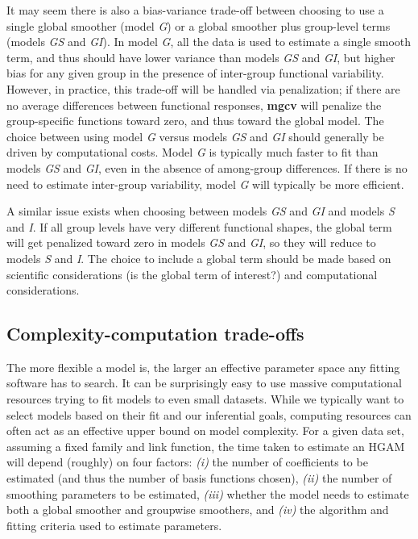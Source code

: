 \documentclass[12pt]{article}
\begin{document}
It may seem there is also a bias-variance trade-off between choosing to
use a single global smoother (model \emph{G}) or a global smoother plus
group-level terms (models \emph{GS} and \emph{GI}). In model \emph{G},
all the data is used to estimate a single smooth term, and thus should
have lower variance than models \emph{GS} and \emph{GI}, but higher bias
for any given group in the presence of inter-group functional
variability. However, in practice, this trade-off will be handled via
penalization; if there are no average differences between functional
responses, \textbf{mgcv} will penalize the group-specific functions
toward zero, and thus toward the global model. The choice between using
model \emph{G} versus models \emph{GS} and \emph{GI} should generally be
driven by computational costs. Model \emph{G} is typically much faster
to fit than models \emph{GS} and \emph{GI}, even in the absence of
among-group differences. If there is no need to estimate inter-group
variability, model \emph{G} will typically be more efficient.

A similar issue exists when choosing between models \emph{GS} and
\emph{GI} and models \emph{S} and \emph{I}. If all group levels have
very different functional shapes, the global term will get penalized
toward zero in models \emph{GS} and \emph{GI}, so they will reduce to
models \emph{S} and \emph{I}. The choice to include a global term should
be made based on scientific considerations (is the global term of
interest?) and computational considerations.

\subsection{Complexity-computation
trade-offs}\label{complexity-computation-trade-offs}

The more flexible a model is, the larger an effective parameter space
any fitting software has to search. It can be surprisingly easy to use
massive computational resources trying to fit models to even small
datasets. While we typically want to select models based on their fit
and our inferential goals, computing resources can often act as an
effective upper bound on model complexity. For a given data set,
assuming a fixed family and link function, the time taken to estimate an
HGAM will depend (roughly) on four factors: \emph{(i)} the number of
coefficients to be estimated (and thus the number of basis functions
chosen), \emph{(ii)} the number of smoothing parameters to be estimated,
\emph{(iii)} whether the model needs to estimate both a global smoother
and groupwise smoothers, and \emph{(iv)} the algorithm and fitting
criteria used to estimate parameters.
\end{document}
